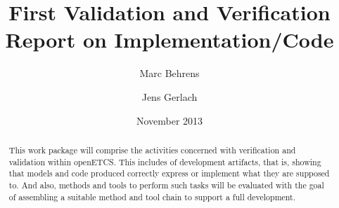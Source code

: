 \documentclass{template/openetcs_article}
\begin{document}
\frontmatter
{}




\title{First Validation and Verification Report on Implementation/Code}


\date{November 2013}


\author{Marc Behrens}

 
\author{Jens Gerlach}






\begin{abstract}

  This work package will comprise the activities concerned with
  verification and validation within openETCS. This includes \vv of
  development artifacts, that is, showing that models and code
  produced correctly express or implement what they are supposed
  to. And also, methods and tools to perform such tasks will be
  evaluated with the goal of assembling a suitable method and tool
  chain to support a full development.

\end{abstract}

\maketitle
\tableofcontents
\listoffiguresandtables
\newpage

\end{document}
